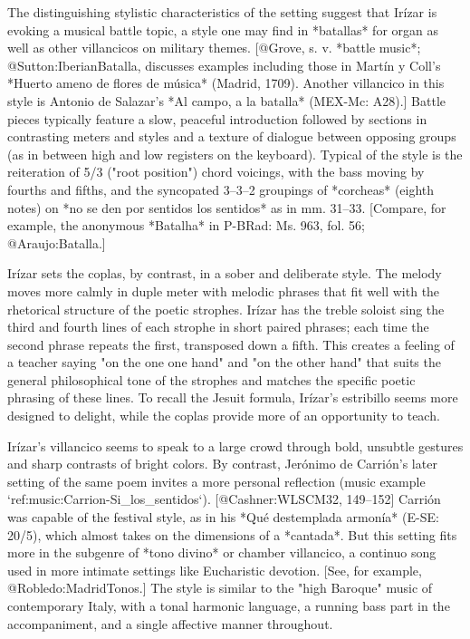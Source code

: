 The distinguishing stylistic characteristics of the setting suggest that Irízar
is evoking a musical battle topic, a style one may find in *batallas* for organ
as well as other villancicos on military themes.
[@Grove, s. v. *battle music*; @Sutton:IberianBatalla, discusses examples
including those in Martín y Coll's *Huerto ameno de flores de música* (Madrid,
1709). 
Another villancico in this style is Antonio de Salazar's *Al campo, a la
batalla* (MEX-Mc: A28).]
Battle pieces typically feature a slow, peaceful introduction followed by
sections in contrasting meters and styles and a texture of dialogue between
opposing groups (as in between high and low registers on the keyboard). 
Typical of the style is the reiteration of 5/3 ("root position") chord voicings,
with the bass moving by fourths and fifths, and the syncopated 3--3--2 groupings
of *corcheas* (eighth notes) on *no se den por sentidos los sentidos* as in mm.
31--33.
[Compare, for example, the anonymous *Batalha* in P-BRad: Ms. 963, fol. 56;
@Araujo:Batalla.] 

Irízar sets the coplas, by contrast, in a sober and deliberate style. 
The melody moves more calmly in duple meter with melodic phrases that fit well
with the rhetorical structure of the poetic strophes. 
Irízar has the treble soloist sing the third and fourth lines of each strophe in
short paired phrases; each time the second phrase repeats the first, transposed
down a fifth.
This creates a feeling of a teacher saying "on the one one hand" and "on the
other hand" that suits the general philosophical tone of the strophes and
matches the specific poetic phrasing of these lines. 
To recall the Jesuit formula, Irízar's estribillo seems more designed to
delight, while the coplas provide more of an opportunity to teach. 

Irízar's villancico seems to speak to a large crowd through bold, unsubtle
gestures and sharp contrasts of bright colors. 
By contrast, Jerónimo de Carrión's later setting of the same poem invites a more
personal reflection (music example `ref:music:Carrion-Si_los_sentidos`). 
[@Cashner:WLSCM32, 149--152]
Carrión was capable of the festival style, as in his *Qué destemplada armonía*
(E-SE: 20/5), which almost takes on the dimensions of a *cantada*.
But this setting fits more in the subgenre of *tono divino* or chamber
villancico, a continuo song used in more intimate settings like Eucharistic
devotion. 
[See, for example, @Robledo:MadridTonos.]
The style is similar to the "high Baroque" music of contemporary Italy, with a
tonal harmonic language, a running bass part in the accompaniment, and a single
affective manner throughout. 

